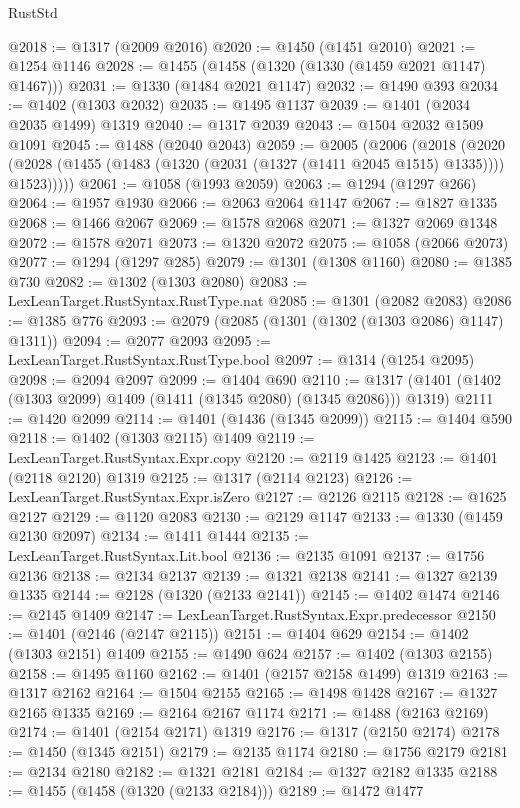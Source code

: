 \begin{lexlean}{RustStd}
\begin{coremodule}
@2018 := @1317 (@2009 @2016)
@2020 := @1450 (@1451 @2010)
@2021 := @1254 @1146
@2028 := @1455 (@1458 (@1320 (@1330 (@1459 @2021 @1147) @1467)))
@2031 := @1330 (@1484 @2021 @1147)
@2032 := @1490 @393
@2034 := @1402 (@1303 @2032)
@2035 := @1495 @1137
@2039 := @1401 (@2034 @2035 @1499) @1319
@2040 := @1317 @2039
@2043 := @1504 @2032 @1509 @1091
@2045 := @1488 (@2040 @2043)
@2059 := @2005
    (@2006
      (@2018
        (@2020 (@2028 (@1455 (@1483 (@1320 (@2031 (@1327 (@1411 @2045 @1515) @1335)))) @1523)))))
@2061 := @1058 (@1993 @2059)
@2063 := @1294 (@1297 @266)
@2064 := @1957 @1930
@2066 := @2063 @2064 @1147
@2067 := @1827 @1335
@2068 := @1466 @2067
@2069 := @1578 @2068
@2071 := @1327 @2069 @1348
@2072 := @1578 @2071
@2073 := @1320 @2072
@2075 := @1058 (@2066 @2073)
@2077 := @1294 (@1297 @285)
@2079 := @1301 (@1308 @1160)
@2080 := @1385 @730
@2082 := @1302 (@1303 @2080)
@2083 := LexLeanTarget.RustSyntax.RustType.nat
@2085 := @1301 (@2082 @2083)
@2086 := @1385 @776
@2093 := @2079 (@2085 (@1301 (@1302 (@1303 @2086) @1147) @1311))
@2094 := @2077 @2093
@2095 := LexLeanTarget.RustSyntax.RustType.bool
@2097 := @1314 (@1254 @2095)
@2098 := @2094 @2097
@2099 := @1404 @690
@2110 := @1317 (@1401 (@1402 (@1303 @2099) @1409 (@1411 (@1345 @2080) (@1345 @2086))) @1319)
@2111 := @1420 @2099
@2114 := @1401 (@1436 (@1345 @2099))
@2115 := @1404 @590
@2118 := @1402 (@1303 @2115) @1409
@2119 := LexLeanTarget.RustSyntax.Expr.copy
@2120 := @2119 @1425
@2123 := @1401 (@2118 @2120) @1319
@2125 := @1317 (@2114 @2123)
@2126 := LexLeanTarget.RustSyntax.Expr.isZero
@2127 := @2126 @2115
@2128 := @1625 @2127
@2129 := @1120 @2083
@2130 := @2129 @1147
@2133 := @1330 (@1459 @2130 @2097)
@2134 := @1411 @1444
@2135 := LexLeanTarget.RustSyntax.Lit.bool
@2136 := @2135 @1091
@2137 := @1756 @2136
@2138 := @2134 @2137
@2139 := @1321 @2138
@2141 := @1327 @2139 @1335
@2144 := @2128 (@1320 (@2133 @2141))
@2145 := @1402 @1474
@2146 := @2145 @1409
@2147 := LexLeanTarget.RustSyntax.Expr.predecessor
@2150 := @1401 (@2146 (@2147 @2115))
@2151 := @1404 @629
@2154 := @1402 (@1303 @2151) @1409
@2155 := @1490 @624
@2157 := @1402 (@1303 @2155)
@2158 := @1495 @1160
@2162 := @1401 (@2157 @2158 @1499) @1319
@2163 := @1317 @2162
@2164 := @1504 @2155
@2165 := @1498 @1428
@2167 := @1327 @2165 @1335
@2169 := @2164 @2167 @1174
@2171 := @1488 (@2163 @2169)
@2174 := @1401 (@2154 @2171) @1319
@2176 := @1317 (@2150 @2174)
@2178 := @1450 (@1345 @2151)
@2179 := @2135 @1174
@2180 := @1756 @2179
@2181 := @2134 @2180
@2182 := @1321 @2181
@2184 := @1327 @2182 @1335
@2188 := @1455 (@1458 (@1320 (@2133 @2184)))
@2189 := @1472 @1477

\end{coremodule}
\end{lexlean}
